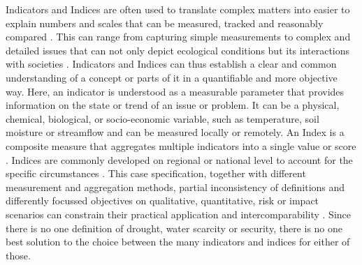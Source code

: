 {Indicators and Indices are often used to translate complex matters into easier to explain numbers and scales that can be measured, tracked and reasonably compared \autocite{blauveltSystematizingEnvironmentalIndicators2014,williamsUsingIndicatorsExplain2017}. This can range from capturing simple measurements to complex and detailed issues that can not only depict ecological conditions but its interactions with societies \autocite{blauveltSystematizingEnvironmentalIndicators2014,mishraWaterSecurityChanging2021}. Indicators and Indices can thus establish a clear and common understanding of a concept or parts of it in a quantifiable and more objective way.
Here, an indicator is understood as a measurable parameter that provides information on the state or trend of an issue or problem. It can be a physical, chemical, biological, or socio-economic variable, such as temperature, soil moisture or streamflow and can be measured locally or remotely. An Index is a composite measure that aggregates multiple indicators into a single value or score \autocite{unitednationsuniversityTooManyIndicators2017,williamsUsingIndicatorsExplain2017, svobodaHandbookDroughtIndicators2016}. Indices are commonly developed on regional or national level to account for the specific circumstances \autocite{unitednationsuniversityTooManyIndicators2017}. This case specification, together with different measurement and aggregation methods, partial inconsistency of definitions and differently focussed objectives on qualitative, quantitative, risk or impact scenarios can constrain their practical application and intercomparability \autocite{svobodaHandbookDroughtIndicators2016,unitednationsuniversityTooManyIndicators2017}. 
Since there is no one definition of drought, water scarcity or security, there is no one best solution to the choice between the many indicators and indices for either of those.



}
